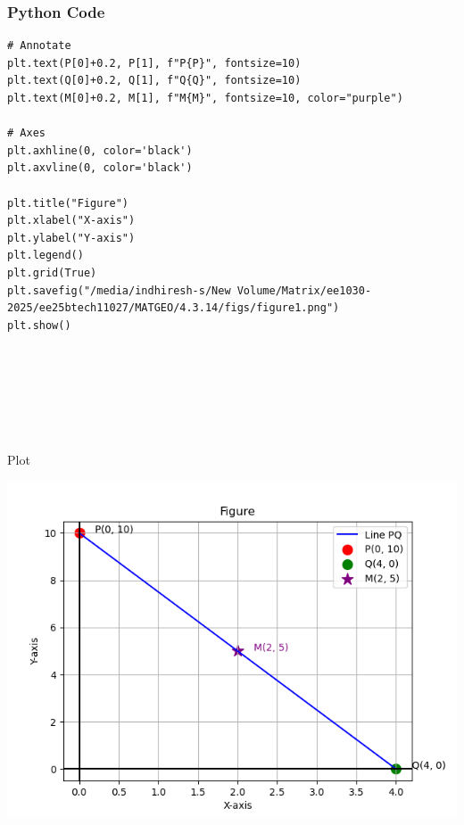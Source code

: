 \documentclass{beamer}
\begin{document}
\begin{frame}[fragile]
    \frametitle{Python Code}

    \begin{lstlisting}
# Annotate
plt.text(P[0]+0.2, P[1], f"P{P}", fontsize=10)
plt.text(Q[0]+0.2, Q[1], f"Q{Q}", fontsize=10)
plt.text(M[0]+0.2, M[1], f"M{M}", fontsize=10, color="purple")

# Axes
plt.axhline(0, color='black')
plt.axvline(0, color='black')

plt.title("Figure")
plt.xlabel("X-axis")
plt.ylabel("Y-axis")
plt.legend()
plt.grid(True)
plt.savefig("/media/indhiresh-s/New Volume/Matrix/ee1030-2025/ee25btech11027/MATGEO/4.3.14/figs/figure1.png")
plt.show()







    \end{lstlisting}
\end{frame}



\begin{frame}{Plot}
    \begin{center}
        \includegraphics[width=\columnwidth, height=0.8\textheight, keepaspectratio]{figs/figure1.png}
    \end{center}
\end{frame}
\end{document}
